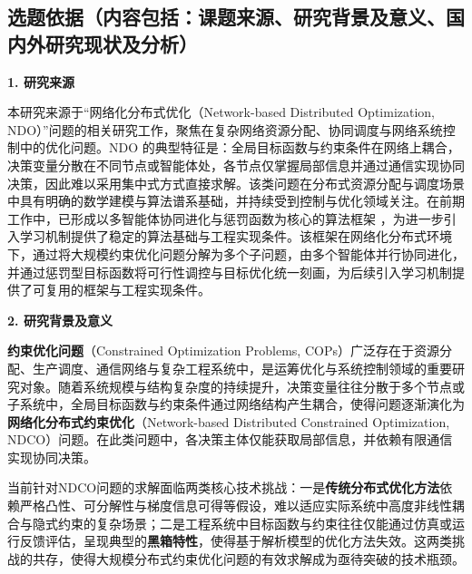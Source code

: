\begin{titlepage}
\makeatletter
\newpage
{}
\makeatother
\section{选题依据（内容包括：课题来源、研究背景及意义、国内外研究现状及分析）}

\noindent 
\textbf{1. 研究来源}

\par
\indent
本研究来源于“网络化分布式优化（Network-based Distributed Optimization, NDO）”问题的相关研究工作，聚焦在复杂网络资源分配、协同调度与网络系统控制中的优化问题。NDO 的典型特征是：全局目标函数与约束条件在网络上耦合，决策变量分散在不同节点或智能体处，各节点仅掌握局部信息并通过通信实现协同决策，因此难以采用集中式方式直接求解。该类问题在分布式资源分配与调度场景中具有明确的数学建模与算法谱系基础，并持续受到控制与优化领域关注。在前期工作中，已形成以多智能体协同进化与惩罚函数为核心的算法框架 \cite{chen2020}，为进一步引入学习机制提供了稳定的算法基础与工程实现条件。该框架在网络化分布式环境下，通过将大规模约束优化问题分解为多个子问题，由多个智能体并行协同进化，并通过惩罚型目标函数将可行性调控与目标优化统一刻画，为后续引入学习机制提供了可复用的框架与工程实现条件。

\noindent 
\textbf{2. 研究背景及意义}

\par
\indent
\textbf{约束优化问题}（Constrained Optimization Problems, COPs）广泛存在于资源分配、生产调度、通信网络与复杂工程系统中，是运筹优化与系统控制领域的重要研究对象。随着系统规模与结构复杂度的持续提升，决策变量往往分散于多个节点或子系统中，全局目标函数与约束条件通过网络结构产生耦合，使得问题逐渐演化为\textbf{网络化分布式约束优化}（Network-based Distributed Constrained Optimization, NDCO）问题。在此类问题中，各决策主体仅能获取局部信息，并依赖有限通信实现协同决策。

\par
\indent
当前针对NDCO问题的求解面临两类核心技术挑战：一是\textbf{传统分布式优化方法}依赖严格凸性、可分解性与梯度信息可得等假设，难以适应实际系统中高度非线性耦合与隐式约束的复杂场景；二是工程系统中目标函数与约束往往仅能通过仿真或运行反馈评估，呈现典型的\textbf{黑箱特性}，使得基于解析模型的优化方法失效。这两类挑战的共存，使得大规模分布式约束优化问题的有效求解成为亟待突破的技术瓶颈。


\end{titlepage}
